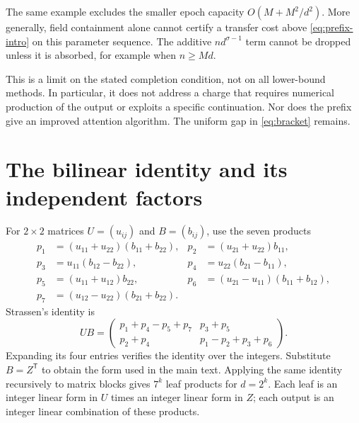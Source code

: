 \documentclass[11pt]{article}
\theoremstyle{definition}
\theoremstyle{remark}
\begin{document}
The same example excludes the smaller epoch capacity
$O(M+M^2/d^2)$. More generally, field containment alone cannot
certify a transfer cost above \cref{eq:prefix-intro} on this
parameter sequence. The additive $nd^{\sigma-1}$ term cannot be
dropped unless it is absorbed, for example when $n\ge Md$.

This is a limit on the stated completion condition, not on all
lower-bound methods. In particular, it does not address a charge
that requires numerical production of the output or exploits a
specific continuation. Nor does the prefix give an improved attention
algorithm. The uniform gap in \cref{eq:bracket} remains.

\appendix
{}
\section{The bilinear identity and its independent factors}
\label{app:strassen}
For $2\times2$ matrices $U=(u_{ij})$ and $B=(b_{ij})$, use the seven
products
\begin{align*}
 p_1&=(u_{11}+u_{22})(b_{11}+b_{22}),&
 p_2&=(u_{21}+u_{22})b_{11},\\
 p_3&=u_{11}(b_{12}-b_{22}),&
 p_4&=u_{22}(b_{21}-b_{11}),\\
 p_5&=(u_{11}+u_{12})b_{22},&
 p_6&=(u_{21}-u_{11})(b_{11}+b_{12}),\\
 p_7&=(u_{12}-u_{22})(b_{21}+b_{22}).
\end{align*}
Strassen's identity \cite{strassen1969} is
\begin{equation}
 UB=\begin{pmatrix}
 p_1+p_4-p_5+p_7 & p_3+p_5\\
 p_2+p_4 & p_1-p_2+p_3+p_6
 \end{pmatrix}.
 \label{eq:strassen-base}
\end{equation}
Expanding its four entries verifies the identity over the integers.
Substitute $B=Z^{\mathsf T}$ to obtain the form used in the main text.
Applying the same identity recursively to matrix blocks gives $7^k$
leaf products for $d=2^k$. Each leaf is an integer linear form in $U$
times an integer linear form in $Z$; each output is an integer linear
combination of these products.
\end{document}
